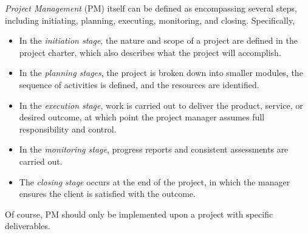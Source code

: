 \documentclass[oneside, 12pt]{book}
\begin{document}
\bigskip
\emph{Project Management} (PM) itself can be defined as encompassing several steps, including initiating, planning, executing, monitoring, and closing. Specifically,
\begin{itemize}
    \item In the \emph{initiation stage}, the nature and scope of a project are defined in the project charter, which also describes what the project will accomplish.

    \item In the \emph{planning stages}, the project is broken down into smaller modules, the sequence of activities is defined, and the resources are identified.

    \item In the \emph{execution stage}, work is carried out to deliver the product, service, or desired outcome, at which point the project manager assumes full responsibility and control.

    \item In the \emph{monitoring stage}, progress reports and consistent assessments are carried out.

    \item The \emph{closing stage} occurs at the end of the project, in which the manager ensures the client is satisfied with the outcome.
\end{itemize}
Of course, PM should only be implemented upon a project with specific deliverables.
\end{document}
